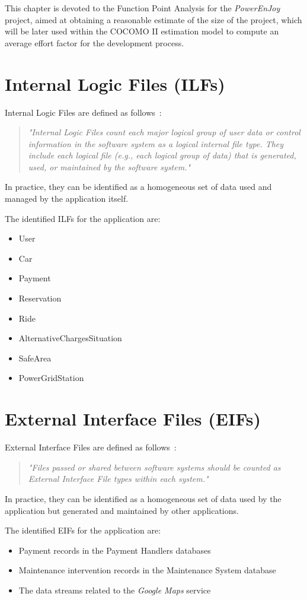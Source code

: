 This chapter is devoted to the Function Point Analysis for the \textit{PowerEnJoy} project, aimed at obtaining a reasonable estimate of the size of the project, which will be later used within the COCOMO II estimation model to compute an average effort factor for the development process.

\section{Internal Logic Files (ILFs)}
Internal Logic Files are defined as follows~\cite{cocomo-manual}:
\begin{quotation}
\textit{"Internal Logic Files count each major logical group of user data or control information in the software system as a logical internal file type. They include each logical file (e.g., each logical group of data) that is generated, used, or maintained by the software system."}
\end{quotation}
\noindent
In practice, they can be identified as a homogeneous set of data used and managed by the application itself.

The identified ILFs for the application are:
\begin{itemize}
\item User
\item Car
\item Payment
\item Reservation
\item Ride
\item AlternativeChargesSituation
\item SafeArea
\item PowerGridStation
\end{itemize}

\section{External Interface Files (EIFs)}
External Interface Files are defined as follows~\cite{cocomo-manual}:
\begin{quotation}
\textit{"Files passed or shared between software systems should be counted as External Interface File types within each system."}
\end{quotation}
In practice, they can be identified as a homogeneous set of data used by the application but generated and maintained by other applications.

The identified EIFs for the application are:
\begin{itemize}
\item Payment records in the Payment Handlers databases
\item Maintenance intervention records in the Maintenance System database
\item The data streams related to the \textit{Google Maps} service
\end{itemize}


